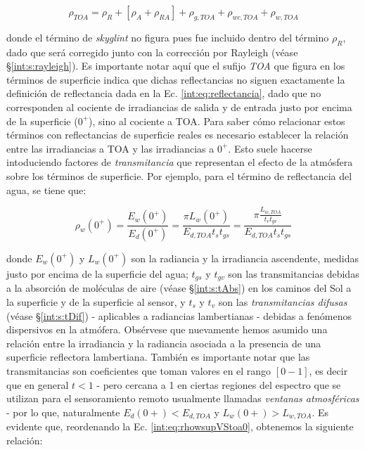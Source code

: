     \begin{equation}
        \rho_{TOA} = \rho_{R} + [\rho_{A} + \rho_{RA}] + \rho_{g,TOA} + \rho_{wc,TOA} + \rho_{w,TOA}
        \label{int:eq:rhotoa1}
    \end{equation}

    \noindent donde el término de \textit{skyglint} no figura pues fue incluido dentro del término $\rho_{R}$, dado que será corregido junto con la corrección por Rayleigh (véase \S \ref{int:s:rayleigh}). Es importante notar aquí que el sufijo \textit{TOA} que figura en los términos de superficie indica que dichas reflectancias no siguen exactamente la definición de reflectancia dada en la Ec. \ref{int:eq:reflectancia}, dado que no corresponden al cociente de irradiancias de salida y de entrada justo por encima de la superficie ($0^{+}$), sino al cociente a TOA. Para saber cómo relacionar estos términos con reflectancias de superficie reales es necesario establecer la relación entre las irradiancias a TOA y las irradiancias a $0^{+}$. Esto suele hacerse intoduciendo factores de \textit{transmitancia} que representan el efecto de la atmósfera sobre los términos de superficie. Por ejemplo, para el término de reflectancia del agua, se tiene que:

    \begin{equation}
        \rho_{w}(0^{+}) = \frac{E_{w}(0^{+})}{E_{d}(0^{+})} = \frac{\pi L_{w}(0^{+})}{E_{d,TOA}t_{s}t_{gs}} = \frac{\pi \frac{L_{w,TOA}}{t_{v}t_{gv}}}{E_{d,TOA}t_{s}t_{gs}} 
        \label{int:eq:rhowsupVStoa0}
    \end{equation}

    \noindent donde $E_{w}(0^{+})$ y $L_{w}(0^{+})$ son la radiancia y la irradiancia ascendente, medidas justo por encima de la superficie del agua; $t_{gs}$ y $t_{gv}$ son las transmitancias debidas a la absorción de moléculas de aire (véase \S \ref{int:s:tAbs}) en los caminos del Sol a la superficie y de la superficie al sensor, y $t_{s}$ y $t_{v}$ son las \textit{transmitancias difusas} (véase \S \ref{int:s:tDif}) - aplicables a radiancias lambertianas - debidas a fenómenos dispersivos en la atmófera. Obsérvese que nuevamente hemos asumido una relación entre la irradiancia y la radiancia asociada a la presencia de una superficie reflectora lambertiana. También es importante notar que las transmitancias son coeficientes que toman valores en el rango $[0-1]$, es decir que en general $t<1$ - pero cercana a 1 en ciertas regiones del espectro que se utilizan para el sensoramiento remoto usualmente llamadas \textit{ventanas atmosféricas} - por lo que, naturalmente $E_{d}(0+)<E_{d,TOA}$ y $L_{w}(0+)>L_{w,TOA}$. Es evidente que, reordenando la Ec. \ref{int:eq:rhowsupVStoa0}, obtenemos la siguiente relación:

